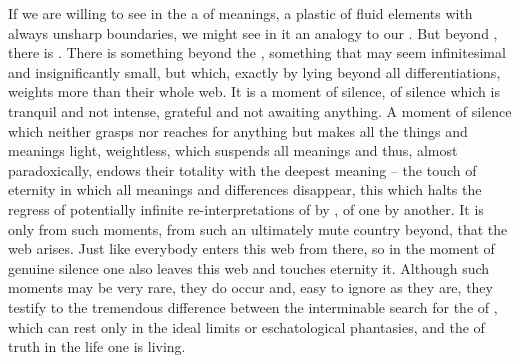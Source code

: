 If we are willing to see in the  a  of meanings, a
plastic  of fluid elements with always unsharp boundaries, we might
see in it an analogy to our . But beyond , there is
. There is something beyond the , something that may
seem infinitesimal and insignificantly small, but which, exactly by lying
beyond all differentiations, weights more than their whole web. It is a moment of
silence, of silence which is tranquil and not intense, grateful and not awaiting
anything. A moment of silence which neither grasps nor reaches for anything but
makes all the things and meanings light, weightless, which suspends all meanings
and thus, almost paradoxically, endows their totality with the deepest meaning
-- the touch of eternity  in which all meanings and differences
disappear, this  which
halts the regress of potentially infinite re-interpretations of  by
, of one  by another. It is only from such moments, from
such an ultimately mute country beyond, that the  web arises.
Just like everybody enters this web from there, so in the moment of genuine
silence one also leaves this web and touches eternity  it. Although such
moments may be very rare, they do occur and, easy to ignore as they are, they
testify to the tremendous difference between the interminable search for the
 of , which can rest only in the ideal limits or
eschatological phantasies, and the  of truth  in the life
one is living.

